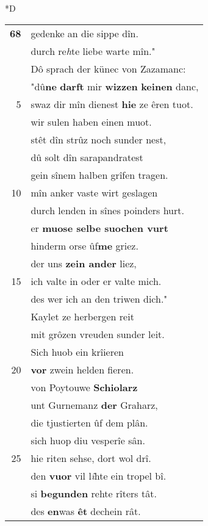 \documentclass[8pt,a4paper,notitlepage]{article}
\begin{document}
\begin{table}[ht]
\begin{minipage}[t]{0.5\linewidth}
\small
\begin{center}*D
\end{center}
\begin{tabular}{rl}
\textbf{68} & gedenke an die sippe dîn.\\ 
 & durch re\textit{h}te liebe warte mîn."\\ 
 & Dô sprach der künec von Zazamanc:\\ 
 & "dû\textbf{ne} \textbf{darft} mir \textbf{wizzen} \textbf{keinen} danc,\\ 
5 & swaz dir mîn dienest \textbf{hie} ze êren tuot.\\ 
 & wir sulen haben einen muot.\\ 
 & stêt dîn strûz noch sunder nest,\\ 
 & dû solt dîn sarapandratest\\ 
 & gein sînem halben grîfen tragen.\\ 
10 & mîn anker vaste wirt geslagen\\ 
 & durch lenden in sînes poinders hurt.\\ 
 & er \textbf{muose selbe suochen vurt}\\ 
 & hinderm orse ûf\textbf{me} griez.\\ 
 & der uns \textbf{zein ander} liez,\\ 
15 & ich valte in oder er valte mich.\\ 
 & des wer ich an den triwen dich."\\ 
 & Kaylet ze herbergen reit\\ 
 & mit grôzen vreuden sunder leit.\\ 
 & Sich huob ein krîieren\\ 
20 & \textbf{vor} zwein helden fieren.\\ 
 & von Poytouwe \textbf{Schiolarz}\\ 
 & unt Gurnemanz \textbf{der} Graharz,\\ 
 & die tjustierten ûf dem plân.\\ 
 & sich huop diu vesperîe sân.\\ 
25 & hie riten sehse, dort wol drî.\\ 
 & den \textbf{vuor} vil l\textit{î}hte ein tropel bî.\\ 
 & si \textbf{begunden} rehte rîters tât.\\ 
 & des \textbf{en}was \textbf{êt} dechein rât.\\ 

\end{tabular}
\end{minipage}
\end{table}
\end{document}

